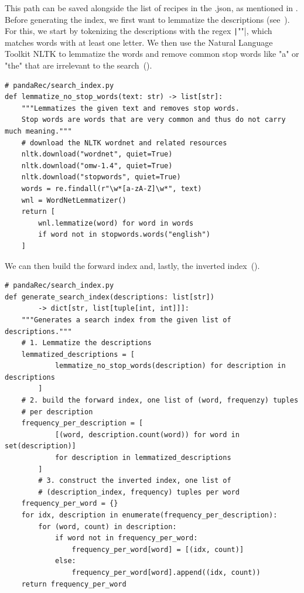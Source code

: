 \documentclass[
     12pt,                    %
     a4paper,             %
     BCOR=10mm,     %
     DIV=14,                 %
     listof=totoc,                    %
     bibliography=totoc,       %
     index=totoc,              %
     twoside,
     headsepline
     ]{scrreprt}
\begin{document}
This path can be saved alongside the list of recipes in the .json, as mentioned in . Before generating the index, we first want to lemmatize the descriptions (see~). For this, we start by tokenizing the descriptions with the regex \texttt|"\w*[a-zA-Z]\w*"|, which matches words with at least one letter. We then use the Natural Language Toolkit NLTK to lemmatize the words and remove common stop words like "a" or "the" that are irrelevant to the search~().

\begin{listing}[htb]
	\begin{verbatim}
# pandaRec/search_index.py
def lemmatize_no_stop_words(text: str) -> list[str]:
	"""Lemmatizes the given text and removes stop words.
	Stop words are words that are very common and thus do not carry much meaning."""
	# download the NLTK wordnet and related resources
	nltk.download("wordnet", quiet=True)
	nltk.download("omw-1.4", quiet=True)
	nltk.download("stopwords", quiet=True)
	words = re.findall(r"\w*[a-zA-Z]\w*", text)
	wnl = WordNetLemmatizer()
	return [
		wnl.lemmatize(word) for word in words
		if word not in stopwords.words("english")
	]
	\end{verbatim}
	\caption[Lemmatization]{Lemmatization.\label{list:lemmatize}}
\end{listing}


We can then build the forward index and, lastly, the inverted index~().

\clearpage

\begin{listing}[htb]
	\begin{verbatim}
# pandaRec/search_index.py
def generate_search_index(descriptions: list[str])
		-> dict[str, list[tuple[int, int]]]:
	"""Generates a search index from the given list of descriptions."""
	# 1. Lemmatize the descriptions
	lemmatized_descriptions = [
			lemmatize_no_stop_words(description) for description in descriptions
		]
	# 2. build the forward index, one list of (word, frequenzy) tuples
	# per description
	frequency_per_description = [
			[(word, description.count(word)) for word in set(description)]
			for description in lemmatized_descriptions
		]
		# 3. construct the inverted index, one list of
		# (description_index, frequency) tuples per word
	frequency_per_word = {}
	for idx, description in enumerate(frequency_per_description):
		for (word, count) in description:
			if word not in frequency_per_word:
				frequency_per_word[word] = [(idx, count)]
			else:
				frequency_per_word[word].append((idx, count))
	return frequency_per_word
	\end{verbatim}
	\caption[Building the Inverted Index]{Building the Inverted Index.\label{list:invertedindex}}
\end{listing}
\end{document}
